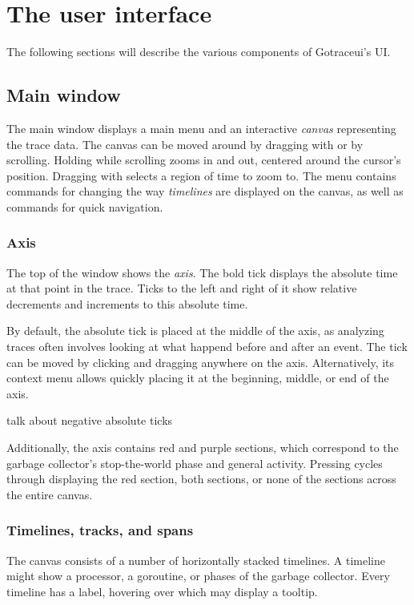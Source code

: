 \documentclass[10pt,letterpaper,oneside,openany,showtrims]{memoir}
\newcommand{\noun}[1]{{\emph{#1}}}
\newcommand{\todo}[1]{{\color{red}#1}}
\newcommand{\shortcut}{\ctrl{} or \cmdmac}
\begin{document}
\chapter{The user interface}
The following sections will describe the various components of Gotraceui's UI.

\section{Main window}
The main window displays a main menu and an interactive \noun{canvas} representing the trace data.
The canvas can be moved around by dragging with  or by scrolling.
Holding \keys{\shortcut} while scrolling zooms in and out, centered around the cursor's position.
Dragging with \keys{\shortcut+LMB} selects a region of time to zoom to.
The  menu contains commands for changing the way \noun{timelines} are displayed on the canvas,
as well as commands for quick navigation.

\subsection{Axis}
The top of the window shows the \noun{axis}.
The bold tick displays the absolute time at that point in the trace.
Ticks to the left and right of it show relative decrements and increments to this absolute time.

By default, the absolute tick is placed at the middle of the axis,
as analyzing traces often involves looking at what happend before and after an event.
The tick can be moved by clicking and dragging anywhere on the axis.
Alternatively, its context menu allows quickly placing it at the beginning, middle, or end of the axis.

\todo{talk about negative absolute ticks}

Additionally, the axis contains red and purple sections,
which correspond to the garbage collector's stop-the-world phase and general activity.
Pressing  cycles through displaying the red section, both sections, or none of the sections across the entire canvas.

\subsection{Timelines, tracks, and spans}
The canvas consists of a number of horizontally stacked timelines.
A timeline might show a processor, a goroutine, or phases of the garbage collector.
Every timeline has a label, hovering over which may display a tooltip.
\end{document}
